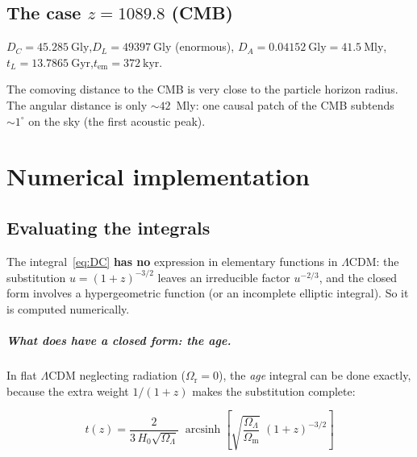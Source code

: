 \documentclass[11pt,a4paper,openany]{report}
\newcommand{\Gyr}{\text{Gyr}}
\newcommand{\Gly}{\text{Gly}}
\newcommand{\Hzero}{H_{0}}
\newcommand{\Om}{\Omega_{\mathrm{m}}}
\newcommand{\Or}{\Omega_{\mathrm{r}}}
\newcommand{\OL}{\Omega_{\Lambda}}
\DeclareMathOperator{\arcsinh}{arcsinh}
\begin{document}
\section{The case \texorpdfstring{$z=1089.8$}{z=1089.8} (CMB)}

\begin{tcolorbox}[numeric]
$D_{C} = \num{45.285}~\Gly$,\quad $D_{L} = \num{49397}~\Gly$ (enormous),\quad
$D_{A} = \num{0.04152}~\Gly = \num{41.5}~\text{Mly}$,\quad
$t_{L} = \num{13.7865}~\Gyr$,\quad $t_{\text{em}} = \num{372}~\text{kyr}$.

\medskip
The comoving distance to the CMB is very close to the particle horizon radius.
The angular distance is only $\sim 42$~Mly: one causal patch of the CMB
subtends $\sim 1^{\circ}$ on the sky (the first acoustic peak).
\end{tcolorbox}

\clearpage

\chapter{Numerical implementation}

\section{Evaluating the integrals}

The integral~\eqref{eq:DC} \textbf{has no} expression in elementary functions in
$\Lambda$CDM: the substitution $u = (1+z)^{-3/2}$ leaves an irreducible factor
$u^{-2/3}$, and the closed form involves a hypergeometric function (or an
incomplete elliptic integral). So it is computed numerically.

\paragraph{What does have a closed form: the age.} In flat $\Lambda$CDM
neglecting radiation ($\Or = 0$), the \emph{age} integral can be done exactly,
because the extra weight $1/(1+z)$ makes the substitution complete:

\begin{equation}
\boxed{\;t(z) = \frac{2}{3\,\Hzero\sqrt{\OL}}\;
\arcsinh\!\left[\sqrt{\frac{\OL}{\Om}}\;(1+z)^{-3/2}\right]\;}
\label{eq:age_closed}
\end{equation}
\end{document}

